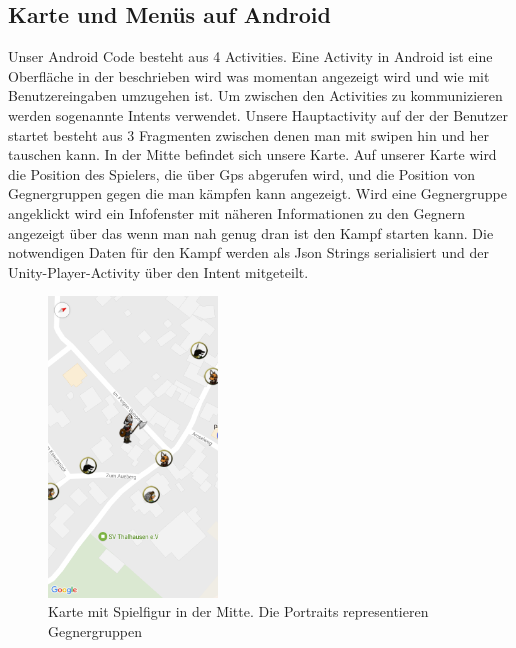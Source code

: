 \documentclass[extern,palatino]{cgBA}
\begin{document}
\subsection{Karte und Menüs auf Android}
Unser Android Code besteht aus 4 Activities. Eine Activity in Android ist eine Oberfläche in der beschrieben wird was momentan angezeigt wird und wie mit Benutzereingaben umzugehen ist. Um zwischen den Activities zu kommunizieren werden sogenannte Intents verwendet. Unsere Hauptactivity auf der der Benutzer startet besteht aus 3 Fragmenten zwischen denen man mit swipen hin und her tauschen kann. In der Mitte befindet sich unsere Karte. Auf unserer Karte wird die Position des Spielers, die über Gps abgerufen wird, und die Position von Gegnergruppen gegen die man kämpfen kann angezeigt. Wird eine Gegnergruppe angeklickt wird ein Infofenster mit näheren Informationen zu den Gegnern angezeigt über das wenn man nah genug dran ist den Kampf starten kann. Die notwendigen Daten für den Kampf werden als Json Strings serialisiert und der Unity-Player-Activity über den Intent mitgeteilt.
\begin{figure}[htb] 
	\centering
	\includegraphics[width=0.4\textwidth]{map.png}
	\caption{Karte mit Spielfigur in der Mitte. Die Portraits representieren Gegnergruppen}
	\label{fig:Bild1}
\end{figure}
\end{document}
